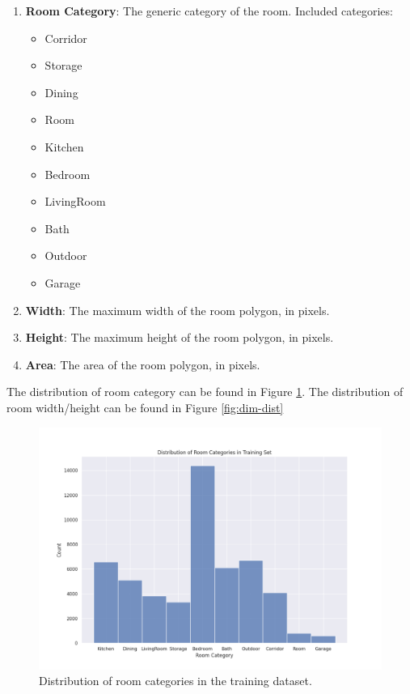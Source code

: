 \documentclass{article}
\begin{document}
\begin{enumerate}
    \item \textbf{Room Category}: The generic category of the room. Included categories:
          \begin{itemize}
              \item Corridor
              \item Storage
              \item Dining
              \item Room
              \item Kitchen
              \item Bedroom
              \item LivingRoom
              \item Bath
              \item Outdoor
              \item Garage
          \end{itemize}
    \item \textbf{Width}: The maximum width of the room polygon, in pixels.
    \item \textbf{Height}: The maximum height of the room polygon, in pixels.
    \item \textbf{Area}: The area of the room polygon, in pixels.
\end{enumerate}

The distribution of room category can be found in Figure \ref{fig:cat-dist}. The distribution of room width/height can be found in Figure \ref{fig:dim-dist}

\begin{figure}
    \centering
    \includegraphics[width=.9\textwidth]{figures/cat-dist.png}
    \caption{Distribution of room categories in the training dataset.}
    \label{fig:cat-dist}
\end{figure}
\end{document}
